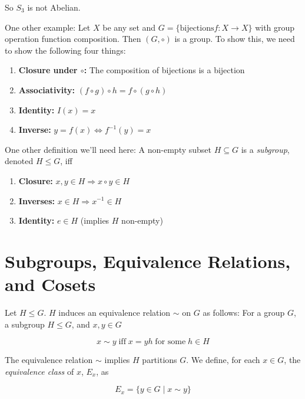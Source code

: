 \documentclass{article}
\theoremstyle{definition}
\begin{document}
\noindent
So $S_3$ is not Abelian. 

\bigskip
\noindent
One other example: Let $X$ be any set and $G =\{\text{bijections
} f: X \rightarrow X \}$ with group operation function
composition. Then $(G, \circ)$ is a group. To show this, we need
to show the following four things:

\begin{enumerate}
\item \textbf{Closure under $\circ$:} The composition of bijections 
			  is a bijection
\item \textbf{Associativity:} $(f \circ g) \circ h = f \circ (g \circ h)$
\item \textbf{Identity: } $I(x) = x$
\item \textbf{Inverse:} $y = f(x) \Leftrightarrow f^{-1}(y) = x$
\end{enumerate}


\bigskip
\noindent
One other definition we'll need here: A non-empty subset $H
\subseteq G$ is a \emph{subgroup}, denoted $H \leq G$, iff

\begin{enumerate}
\item \textbf{Closure:}  $x,y \in H  \Rightarrow x \circ y \in H$
\item \textbf{Inverses:} $x \in H \Rightarrow x^{-1} \in H$
\item \textbf{Identity:} $e \in H$  (implies $H$ non-empty)
\end{enumerate}

\section{Subgroups, Equivalence Relations, and Cosets}

Let $H \leq G$. $H$ induces an equivalence relation $\sim$ on $G$
as follows: For a group $G$, a subgroup $H \leq G$, and $x,y \in G$

\begin{equation}
x \sim y \; \text{iff} \; x = yh \;\text{for some}\;  h \in H
\label{eqn:er}
\end{equation}

\medskip
\noindent
The equivalence relation $\sim$ implies $H$ partitions $G$. We
define, for each $x \in G$, the \emph{equivalence class} of 
$x$, $E_{x}$, as


\begin{equation}
E_x = \{y \in G \mid x \sim y \}
\label{eqn:E_x}
\end{equation}
\end{document}
